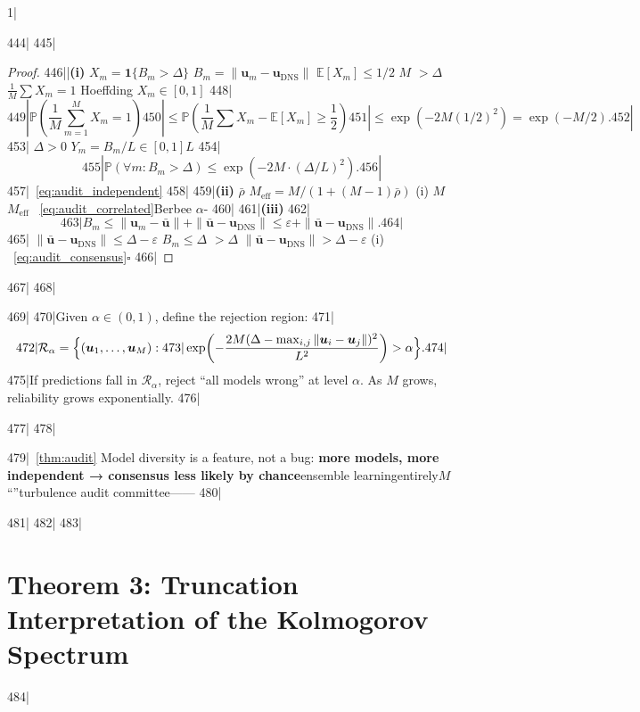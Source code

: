 1|\documentclass[11pt,a4paper]{article}
\begin{document}
444|
445|\begin{proof}
446||\textbf{(i) }  $X_m = \mathbf{1}\{B_m > \Delta\}$ $B_m = \|\bm{u}_m - \bm{u}_{\text{DNS}}\|$ $\mathbb{E}[X_m] \leq 1/2$ $M$  $> \Delta$  $\frac{1}{M}\sum X_m = 1$ Hoeffding $X_m \in [0,1]$
448|\[
449|\mathbb{P}\!\left(\frac{1}{M}\sum_{m=1}^M X_m = 1\right)
450|\leq \mathbb{P}\!\left(\frac{1}{M}\sum X_m - \mathbb{E}[X_m] \geq \frac{1}{2}\right)
451|\leq \exp\!\left(-2M(1/2)^2\right) = \exp(-M/2).
452|\]
453| $\Delta > 0$ $Y_m = B_m/L \in [0,1]$$L$ 
454|\[
455|\mathbb{P}(\forall m: B_m > \Delta) \leq \exp(-2M \cdot (\Delta/L)^2).
456|\]
457|~\eqref{eq:audit_independent}
458|
459|\textbf{(ii) }  $\bar{\rho}$  $M_{\text{eff}} = M/(1+(M-1)\bar{\rho})$ (i)  $M$  $M_{\text{eff}}$ ~\eqref{eq:audit_correlated}Berbee  $\alpha$-
460|
461|\textbf{(iii) } 
462|\[
463|B_m \leq \|\bm{u}_m - \bar{\bm{u}}\| + \|\bar{\bm{u}} - \bm{u}_{\text{DNS}}\| \leq \varepsilon + \|\bar{\bm{u}} - \bm{u}_{\text{DNS}}\|.
464|\]
465| $\|\bar{\bm{u}} - \bm{u}_{\text{DNS}}\| \leq \Delta - \varepsilon$ $B_m \leq \Delta$ $> \Delta$  $\|\bar{\bm{u}} - \bm{u}_{\text{DNS}}\| > \Delta - \varepsilon$ (i) ~\eqref{eq:audit_consensus}$\square$
466|\end{proof}
467|
468|\begin{corollary}
469|\label{cor:audit_rule}
470|Given $\alpha \in (0, 1)$, define the rejection region:
471|\begin{equation}
472|  \mathcal{R}_{\alpha} = \Bigl\{ (\bm{u}_1, \dots, \bm{u}_M) :
473|  \exp\!\left(-\frac{2M(\Delta - \max_{i,j}\left\lVert\bm{u}_i - \bm{u}_j\right\rVert)^2}{L^2}\right) > \alpha \Bigr\}.
474|\end{equation}
475|If predictions fall in $\mathcal{R}_{\alpha}$, reject ``all models wrong'' at level $\alpha$. As $M$ grows, reliability grows exponentially.
476|\end{corollary}
477|
478|\begin{remark}
479|~\ref{thm:audit} Model diversity is a feature, not a bug: \textbf{more models, more independent → consensus less likely by chance}ensemble learningentirely$M$ ``''turbulence audit committee——
480|\end{remark}
481|
482|%
483|\section{Theorem 3: Truncation Interpretation of the Kolmogorov Spectrum}
484|%
\end{document}
